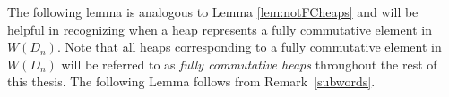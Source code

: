 
The following lemma is analogous to Lemma \ref{lem:notFCheaps} and will be helpful in recognizing when a heap represents a fully commutative element in $W(D_{n})$. Note that all heaps corresponding to a fully commutative element in $W(D_{n})$ will be referred to as \emph{fully commutative heaps} throughout the rest of this thesis. The following Lemma follows from Remark~\ref{subwords}.


